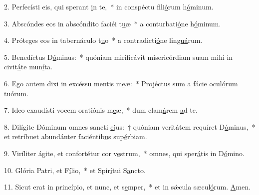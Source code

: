 2. Perfecísti eis, qui sperant \uline{i}n te,~* in conspéctu fili\uline{ó}rum h\uline{ó}minum.\par 
3. Abscóndes eos in abscóndito faciéi t\uline{u}æ~* a conturbati\uline{ó}ne h\uline{ó}minum.\par 
4. Próteges eos in tabernáculo t\uline{u}o~* a contradicti\uline{ó}ne lin\uline{guá}rum.\par 
5. Benedíctus D\uline{ó}minus:~* quóniam mirificávit misericórdiam suam mihi in civit\uline{á}te mun\uline{í}ta.\par 
6. Ego autem dixi in excéssu mentis m\uline{e}æ:~* Projéctus sum a fácie ocul\uline{ó}rum tu\uline{ó}rum.\par 
7. Ideo exaudísti vocem oratiónis m\uline{e}æ,~* dum clam\uline{á}rem \uline{a}d te.\par 
8. Dilígite Dóminum omnes sancti \uline{e}jus:~† quóniam veritátem requíret D\uline{ó}minus,~* et retríbuet abundánter faciéntib\uline{u}s sup\uline{é}rbiam.\par 
9. Viríliter ágite, et confortétur cor v\uline{e}strum,~* omnes, qui sper\uline{á}tis in D\uline{ó}mino.\par 
10. Glória Patri, et F\uline{í}lio,~* et Spir\uline{í}tui S\uline{a}ncto.\par 
11. Sicut erat in princípio, et nunc, et s\uline{e}mper,~* et in sǽcula sæcul\uline{ó}rum. \uline{A}men.\par 
